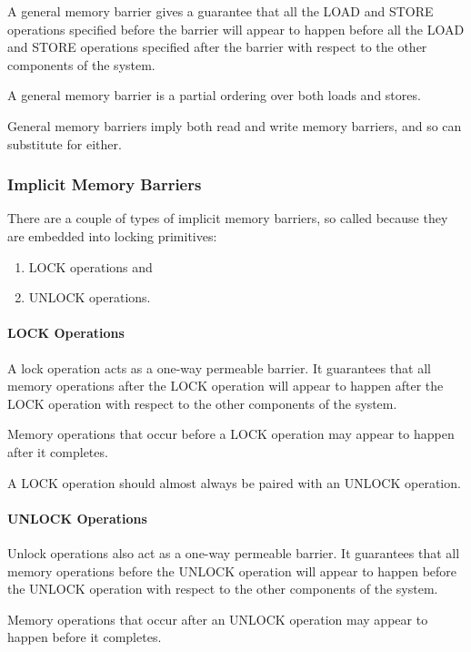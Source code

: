 A general memory barrier gives a guarantee that all the LOAD and STORE
operations specified before the barrier will appear to happen before all
the LOAD and STORE operations specified after the barrier with respect to
the other components of the system.

A general memory barrier is a partial ordering over both loads and stores.

General memory barriers imply both read and write memory barriers, and so
can substitute for either.

\subsubsection{Implicit Memory Barriers}

There are a couple of types of implicit memory barriers, so called
because they are embedded into locking primitives:

\begin{enumerate}
\item	LOCK operations and
\item	UNLOCK operations.
\end{enumerate}

\paragraph{LOCK Operations}

A lock operation acts as a one-way permeable barrier.
It guarantees that all memory
operations after the LOCK operation will appear to happen after the LOCK
operation with respect to the other components of the system.

Memory operations that occur before a LOCK operation may appear to happen
after it completes.

A LOCK operation should almost always be paired with an UNLOCK operation.

\paragraph{UNLOCK Operations}

Unlock operations also act as a one-way permeable barrier.
It guarantees that all
memory operations before the UNLOCK operation will appear to happen before
the UNLOCK operation with respect to the other components of the system.

Memory operations that occur after an UNLOCK operation may appear to
happen before it completes.

